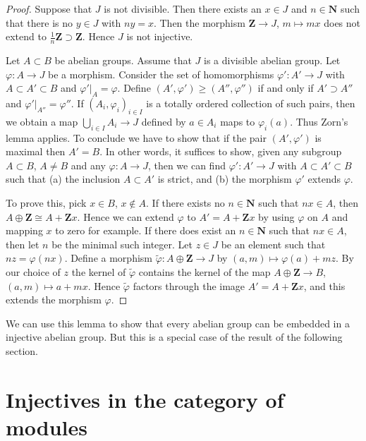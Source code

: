 \begin{proof}
Suppose that $J$ is not divisible. Then there exists
an $x \in J$ and $n \in \mathbf{N}$ such that there
is no $y \in J$ with $n y = x$. Then the morphism
$\mathbf{Z} \to J$, $m \mapsto mx$ does not extend
to $\frac{1}{n}\mathbf{Z} \supset \mathbf{Z}$. Hence
$J$ is not injective.

\medskip\noindent
Let $A \subset B$ be abelian groups.
Assume that $J$ is a divisible abelian group.
Let $\varphi : A \to J$ be a morphism.
Consider the set of homomorphisms $\varphi' : A' \to J$
with $A \subset A' \subset B$ and $\varphi'|_A = \varphi$.
Define $(A', \varphi') \geq (A'', \varphi'')$ if
and only if $A' \supset A''$ and $\varphi'|_{A''} = \varphi''$.
If $(A_i, \varphi_i)_{i \in I}$ is a totally
ordered collection of such pairs, then we obtain a map
$\bigcup_{i \in I} A_i \to J$ defined by $a \in A_i$
maps to $\varphi_i(a)$. Thus Zorn's lemma applies.
To conclude we have to show that if the pair
$(A', \varphi')$ is maximal then $A' = B$.
In other words, it suffices to show, given
any subgroup $A \subset B$, $A \not = B$ and
any $\varphi : A \to J$, then we can find
$\varphi' : A' \to J$ with $A \subset A' \subset B$
such that (a) the inclusion $A \subset A'$ is strict, and
(b) the morphism $\varphi'$ extends $\varphi$.

\medskip\noindent
To prove this, pick $x \in B$, $x \not \in A$.
If there exists no $n\in \mathbf{N}$ such that
$nx \in A$, then $A \oplus \mathbf{Z} \cong A + \mathbf{Z}x$.
Hence we can extend $\varphi$ to $A' = A + \mathbf{Z}x$
by using $\varphi$ on $A$ and mapping $x$ to zero for example.
If there does exist an $n \in \mathbf{N}$ such that
$nx \in A$, then let $n$ be the minimal such integer.
Let $z \in J$ be an element such that $nz = \varphi(nx)$.
Define a morphism $\tilde\varphi : A \oplus \mathbf{Z} \to J$ by
$(a, m) \mapsto \varphi(a) + mz$. By our choice of
$z$ the kernel of $\tilde \varphi$ contains the kernel
of the map $A \oplus \mathbf{Z} \to B$,
$(a, m) \mapsto a + mx$. Hence $\tilde \varphi$ factors
through the image $A' = A + \mathbf{Z}x$, and this extends the morphism
$\varphi$.
\end{proof}

\noindent
We can use this lemma to show that every abelian
group can be embedded in a injective abelian
group. But this is a special case of the result of
the following section.





\section{Injectives in the category of modules}
\label{section-injectives-modules}

